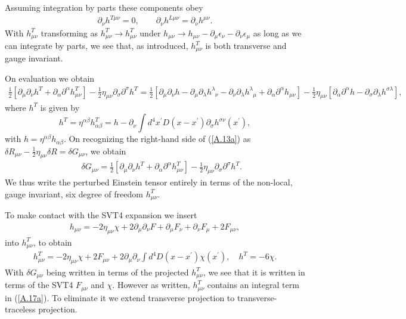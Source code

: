\documentclass[aps,onecolumn,10pt]{revtex4}
\numberwithin{equation}{section}
\numberwithin{equation}{section}
\begin{document}
%
Assuming integration by parts these components obey
%
\begin{eqnarray}
\partial_{\nu}h^{T\mu\nu}
=0,\qquad 
\partial_{\nu}h^{L\mu\nu}=\partial_{\nu}h^{\mu\nu}.
\label{A.12a}
\end{eqnarray}
% 
With $h^{T}_{\mu\nu}$ transforming as $h^{T}_{\mu\nu}\rightarrow h^{T}_{\mu\nu}$ under $h_{\mu\nu}\rightarrow h_{\mu\nu}-\partial_{\mu}\epsilon_{\nu}-\partial_{\nu}\epsilon_{\mu}$ as long as we can integrate by parts, we see that, as introduced, $h^{T}_{\mu\nu}$ is both transverse and gauge invariant. 

On evaluation we obtain 
%
\begin{align}
\frac{1}{2}[\partial_{\mu}\partial_{\nu}h^{T}
+\partial_{\alpha}\partial^{\alpha}h_{\mu\nu}^{T}]
-\frac{1}{2}\eta_{\mu\nu}\partial_{\sigma}\partial^{\sigma}
h^{T}
=\frac{1}{2}[\partial_{\mu}\partial_{\nu}h
-\partial_{\mu}\partial_{\lambda}h^{\lambda}_{\phantom{\lambda}\nu}
-\partial_{\nu}\partial_{\lambda}h^{\lambda}_{\phantom{\lambda}\mu}
+\partial_{\alpha}\partial^{\alpha}h_{\mu\nu}]
-\frac{1}{2}\eta_{\mu\nu}[\partial_{\alpha}\partial^{\alpha}h
-\partial_{\sigma}\partial_{\lambda}h^{\sigma\lambda}],
\label{A.13a}
\end{align}
%
where $h^{T}$ is given by
%
\begin{equation}
h^{T}=\eta^{\alpha\beta}h_{\alpha\beta}^{T}
=h -\partial_{\nu}\int
d^4x^{\prime}D(x-x^{\prime})\partial_{\sigma}
h^{\sigma\nu}(x^{\prime}),
\label{A.14a}
\end{equation}
%
with $h=\eta^{\alpha\beta}h_{\alpha\beta}$. On recognizing the right-hand side of  (\ref{A.13a}) as $\delta R_{\mu\nu}-\frac{1}{2}\eta_{\mu\nu}\delta R=\delta G_{\mu\nu}$,
we obtain 
%
\begin{eqnarray}
&&\delta G_{\mu\nu}=\tfrac{1}{2}[\partial_{\mu}\partial_{\nu}h^{T}
+\partial_{\alpha}\partial^{\alpha}h_{\mu\nu}^{T}]
-\frac{1}{2}\eta_{\mu\nu}\partial_{\sigma}\partial^{\sigma}
h^{T}.
\label{A.15a}
\end{eqnarray}
%
We thus write the perturbed Einstein tensor entirely in terms of the non-local, gauge invariant, six degree of freedom $h_{\mu\nu}^T$.

To make contact with the SVT4 expansion we insert
%
\begin{eqnarray}
h_{\mu\nu}=-2\eta_{\mu\nu}\chi+2\partial_{\mu}\partial_{\nu}F
+ \partial_{\mu}F_{\nu}+\partial_{\nu}F_{\mu}+2F_{\mu\nu},
\label{A.16a}
\end{eqnarray}
%
into $h_{\mu\nu}^T$,  to obtain
%
\begin{eqnarray}
h^T_{\mu\nu}=-2\eta_{\mu\nu}\chi+2F_{\mu\nu}+2\partial_{\mu}\partial_{\nu}\int d^4D(x-x^{\prime})\chi(x^{\prime}),\quad h^T=-6\chi.
\label{A.17a}
\end{eqnarray}
%
With $\delta G_{\mu\nu}$ being written in terms of the projected $h^T_{\mu\nu}$, we see that it is written in terms of the SVT4 $F_{\mu\nu}$ and $\chi$. However as written, $h_{\mu\nu}^T$ contains an integral term in (\ref{A.17a}). To eliminate it we extend transverse projection to transverse-traceless projection.
\end{document}
